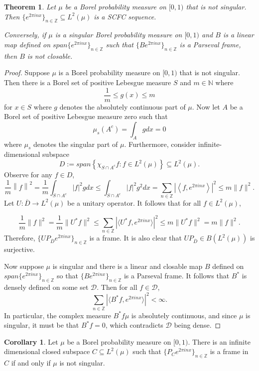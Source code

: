\documentclass[11pt]{amsart}
\newtheorem{thm}{Theorem}[section]
\theoremstyle{definition}
\newtheorem{cor}{Corollary}[section]
\numberwithin{equation}{section}
\begin{document}
\begin{thm}\label{mainFourierthm}
Let $\mu$ be a Borel probability measure on $[0,1)$ that is not singular. Then $\{e^{2\pi i nx}\}_{n\in \mathbb{Z}}\subseteq L^{2}(\mu)$ is a SCFC sequence. 

Conversely, if $\mu$ is a singular Borel probability measure on $[0,1)$ and $B$ is a linear map defined on $span\{e^{2\pi i nx}\}_{n\in \mathbb{Z}}$ such that $\{Be^{2\pi i nx}\}_{n\in \mathbb{Z}}$ is a Parseval frame, then $B$ is not closable.
\end{thm}
\begin{proof}
Suppose $\mu$ is a Borel probability measure on $[0,1)$ that is not singular. Then there is a Borel set of positive Lebesgue measure $S$ and $m\in \mathbb{N}$ where $$\frac{1}{m}\leq g(x)\leq m$$ for $x\in S$ where $g$ denotes the absolutely continuous part of $\mu$. Now let $A$ be a Borel set of positive Lebesgue measure zero such that 
$$\mu_{s}(A^{c})=\int_{A}gdx=0$$ where $\mu_{s}$ denotes the singular part of $\mu$. Furthermore, consider infinite-dimensional subspace
$$D:=span\left\{\chi_{S\cap A^{c}}f: f\in L^{2}(\mu)\right\}\subseteq L^{2}(\mu).$$ Observe for any $f\in D$,
$$\frac{1}{m}\left\|f\right\|^{2}=\frac{1}{m}\int_{S\cap A^{c}}|f|^{2}gdx \leq \int_{S\cap A^{c}}|f|^{2}g^{2}dx=\sum_{n\in \mathbb{Z}} \left|\left\langle f, e^{2\pi i nx}\right \rangle \right|^{2}\leq m \|f\|^{2}.$$ Let $U:\overline{D}\to L^{2}(\mu)$ be a unitary operator. It follows that for all $f\in L^{2}(\mu)$,

$$\frac{1}{m}\|f\|^{2}=\frac{1}{m}\|U^{*}f\|^{2}\leq \sum_{n\in \mathbb{Z}}|\langle U^{*}f, e^{2\pi inx}\rangle|^{2}\leq m\|U^{*}f\|^{2}=m\|f\|^{2}.$$
Therefore, $\{UP_{\overline{D}}e^{2\pi i nx}\}_{n\in \mathbb{Z}}$ is a frame. It is also clear that $UP_{\overline{D}}\in B(L^{2}(\mu))$ is surjective.

Now suppose $\mu$ is singular and there is a linear and closable map $B$ defined on $span\{e^{2\pi i nx}\}_{n\in \mathbb{Z}}$ so that $\{Be^{2\pi i nx}\}_{n\in \mathbb{Z}}$ is a Parseval frame. It follows that $B^{*}$ is densely defined on some set $\mathcal{D}$. Then for all $f\in \mathcal{D}$,
$$\sum_{n\in \mathbb{Z}}|\langle B^{*}f, e^{2\pi i nx}\rangle |^{2}<\infty.$$ In particular, the complex measure $B^{*}f\mu$ is absolutely continuous, and since $\mu$ is singular, it must be that $B^{*}f=0$, which contradicts $\mathcal{D}$ being dense.
\end{proof}

\begin{cor}
Let $\mu$ be a Borel probability measure on $[0,1)$. There is an infinite dimensional closed subspace $C\subseteq L^2(\mu)$ such that $\{P_{C}e^{2\pi i nx}\}_{n\in \mathbb{Z}}$ is a frame in $C$ if and only if $\mu$ is not singular.
\end{cor}
\end{document}
